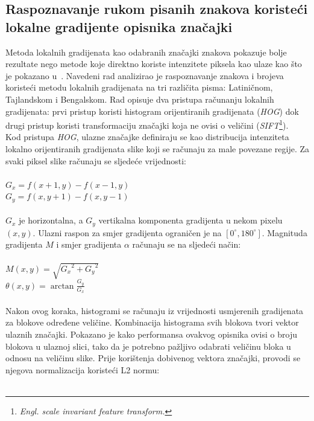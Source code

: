 \subsection{Raspoznavanje rukom pisanih znakova koristeći lokalne gradijente opisnika značajki}
\label{subsec:raspoznavanje-rukom-pisanih-znakova-koristeci-lokalne-gradijente-opisnika-znacajki}
Metoda lokalnih gradijenata kao odabranih značajki znakova pokazuje bolje rezultate nego metode koje direktno koriste
intenzitete piksela kao ulaze kao što je pokazano u\ \citep{surinta2015}. Navedeni rad analizirao je raspoznavanje
znakova i brojeva koristeći metodu lokalnih gradijenata na tri različita pisma: Latiničnom, Tajlandskom i Bengalskom.
Rad opisuje dva pristupa računanju lokalnih gradijenata: prvi pristup koristi histogram orijentiranih gradijenata
(\emph{HOG}) dok drugi pristup koristi transformaciju značajki koja ne ovisi o veličini (\emph{SIFT}\footnote{
    \emph{Engl. scale invariant feature transform.}}).\\
Kod pristupa \emph{HOG}, ulazne značajke definiraju se kao distribucija intenziteta lokalno orijentiranih gradijenata
slike koji se računaju za male povezane regije. Za svaki piksel slike računaju se sljedeće vrijednosti:\\
\\
$G_x = f(x + 1, y) - f(x - 1, y)$\\
$G_y = f(x, y + 1) - f(x, y - 1)$\\
\\
$G_x$ je horizontalna, a $G_y$ vertikalna komponenta gradijenta u nekom pixelu $(x, y)$. Ulazni raspon za smjer
gradijenta ograničen je na $[0^{\circ}, 180^{\circ}]$. Magnituda gradijenta $M$ i smjer gradijenta $\alpha$ računaju se
na sljedeći način:\\
\\
$M(x, y) = \sqrt{{G_x}^2 + {G_y}^2}$\\
$\theta(x, y) = \arctan{\frac{G_y}{G_x}}$\\
\\
Nakon ovog koraka, histogrami se računaju iz vrijednosti usmjerenih gradijenata za blokove određene veličine.
Kombinacija histograma svih blokova tvori vektor ulaznih značajki. Pokazano je kako performansa ovakvog opisnika ovisi
o broju blokova u ulaznoj slici, tako da je potrebno pažljivo odabrati veličinu bloka u odnosu na veličinu slike. Prije
korištenja dobivenog vektora značajki, provodi se njegova normalizacija koristeći L2 normu:\\
\\

